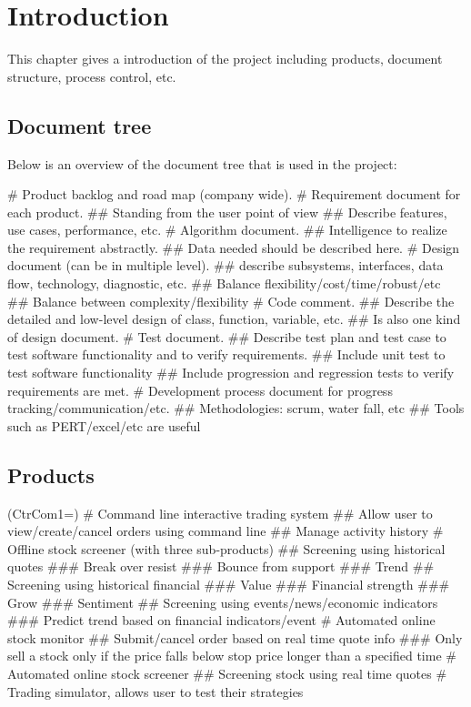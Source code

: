 \chapter{Introduction}
\label{chap:intro}

This chapter gives a introduction of the project including products, document structure, process control, etc.

\section{Document tree}

Below is an overview of the document tree that is used in the project:
\begin{listb}
# Product backlog and road map (company wide).
# Requirement document for each product.
	## Standing from the user point of view
	## Describe features, use cases, performance, etc. 
# Algorithm document.
	## Intelligence to realize the requirement abstractly.
	## Data needed should be described here.
# Design document (can be in multiple level).
    ## describe subsystems, interfaces, data flow, technology, diagnostic, etc.
	## Balance flexibility/cost/time/robust/etc
	## Balance between complexity/flexibility 
# Code comment. 
    ## Describe the detailed and low-level design of class, function, variable, etc.
    ## Is also one kind of design document.
# Test document.
    ## Describe test plan and test case to test software functionality and to verify requirements. 
    ## Include unit test to test software functionality
    ## Include progression and regression tests to verify requirements are met. 
# Development process document for progress tracking/communication/etc.
	## Methodologies: scrum, water fall, etc
	## Tools such as PERT/excel/etc are useful
\end{listb}

\section{Products}


\begin{listb}
\ListProperties(CtrCom1=)
# Command line interactive trading system 
  ##	Allow user to view/create/cancel orders using command line
  ##	Manage activity history
# Offline stock screener (with three sub-products)
  ## Screening using historical quotes
     ### Break over resist
     ### Bounce from support
     ### Trend       
  ## Screening using historical financial
     ### Value 
     ### Financial strength
     ### Grow 
     ### Sentiment  
  ## Screening using events/news/economic indicators 
     ### Predict trend based on financial indicators/event 
# Automated online stock monitor
  ## Submit/cancel order based on real time quote info
     ### Only sell a stock only if the price falls below stop price longer than a specified time
# Automated online stock screener
  ## Screening stock using real time quotes
# Trading simulator, allows user to test their strategies
\end{listb}
